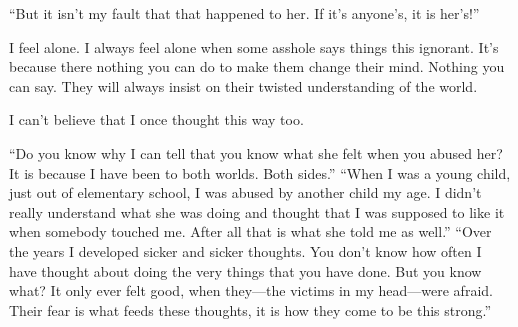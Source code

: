 \documentclass{article}
\begin{document}
	\medskip
	
	\enquote{But it isn't my fault that that happened to her. If it's anyone's, it is her's!}
	
	\medskip
	
	I feel alone. I always feel alone when some asshole says things this ignorant. It's because there nothing you can do to make them change their mind. Nothing you can say. They will always insist on their twisted understanding of the world.
	
	\medskip
	
	I can't believe that I once thought this way too.
	
	\pagebreak
	
	\enquote{Do you know why I can tell that you know what she felt when you abused her? It is because I have been to both worlds. Both sides.} \enquote{When I was a young child, just out of elementary school, I was abused by another child my age. I didn't really understand what she was doing and thought that I was supposed to like it when somebody touched me. After all that is what she told me as well.} \enquote{Over the years I developed sicker and sicker thoughts. You don't know how often I have thought about doing the very things that you have done. But you know what? It only ever felt good, when they—the victims in my head—were afraid. Their fear is what feeds these thoughts, it is how they come to be this strong.}
\end{document}
